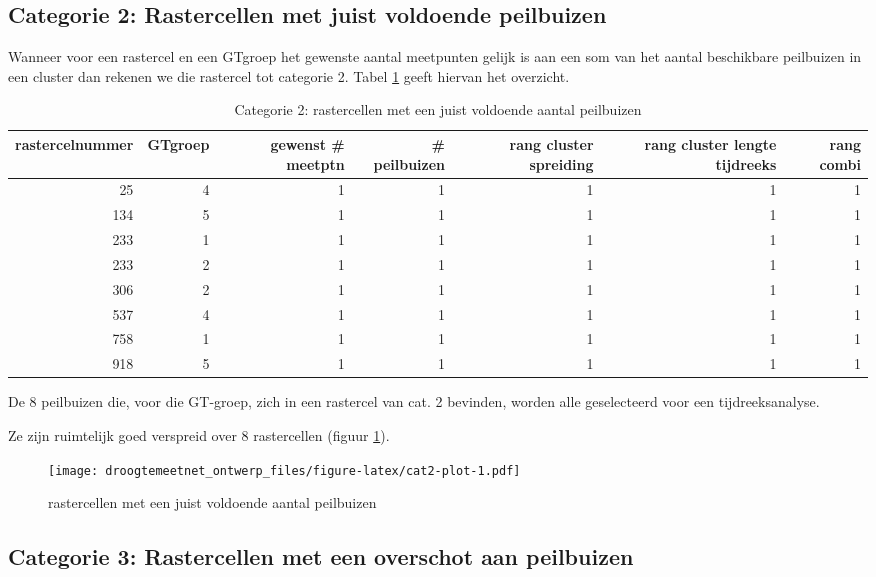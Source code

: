 \documentclass[11pt,]{book}
\begin{document}
\subsection{Categorie 2: Rastercellen met juist voldoende
peilbuizen}\label{cat2}

Wanneer voor een rastercel en een GTgroep het gewenste aantal meetpunten
gelijk is aan een som van het aantal beschikbare peilbuizen in een
cluster dan rekenen we die rastercel tot categorie 2. Tabel
\ref{tab:cat2-table} geeft hiervan het overzicht.

\begin{table}

\caption{\label{tab:cat2-table}Categorie 2: rastercellen met een juist voldoende aantal peilbuizen}
\centering
\begin{tabular}[t]{r|r|r|r|r|r|r}
\hline
rastercelnummer & GTgroep & gewenst \# meetptn & \# peilbuizen & rang cluster spreiding & rang cluster lengte tijdreeks & rang combi\\
\hline
25 & 4 & 1 & 1 & 1 & 1 & 1\\
\hline
134 & 5 & 1 & 1 & 1 & 1 & 1\\
\hline
233 & 1 & 1 & 1 & 1 & 1 & 1\\
\hline
233 & 2 & 1 & 1 & 1 & 1 & 1\\
\hline
306 & 2 & 1 & 1 & 1 & 1 & 1\\
\hline
537 & 4 & 1 & 1 & 1 & 1 & 1\\
\hline
758 & 1 & 1 & 1 & 1 & 1 & 1\\
\hline
918 & 5 & 1 & 1 & 1 & 1 & 1\\
\hline
\end{tabular}
\end{table}

De 8 peilbuizen die, voor die GT-groep, zich in een rastercel van cat. 2
bevinden, worden alle geselecteerd voor een tijdreeksanalyse.

Ze zijn ruimtelijk goed verspreid over 8 rastercellen (figuur
\ref{fig:cat2-plot}).

\begin{figure}
\centering
\texttt{[image: droogtemeetnet\_ontwerp\_files/figure-latex/cat2-plot-1.pdf]}
\caption{\label{fig:cat2-plot}rastercellen met een juist voldoende aantal
peilbuizen}
\end{figure}

\subsection{Categorie 3: Rastercellen met een overschot aan
peilbuizen}\label{cat3}
\end{document}
